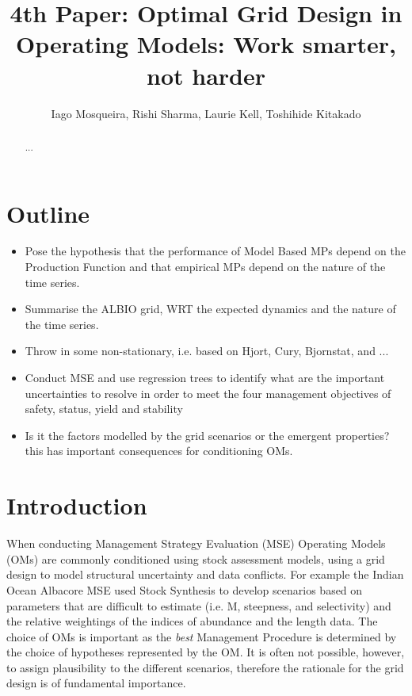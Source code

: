 \documentclass[a4paper]{article}
\title{4th Paper: Optimal Grid Design in Operating Models: Work smarter, not harder}
\author{Iago Mosqueira, Rishi Sharma, Laurie Kell, Toshihide  Kitakado}
\begin{document}
\maketitle

\begin{abstract}

... 

\end{abstract}

\section*{Outline}

\begin{itemize}
\item Pose the hypothesis that the performance of Model Based MPs depend on the Production Function and that empirical MPs depend on the nature of the time series.
\item Summarise the ALBIO grid, WRT the expected dynamics and the nature of the time series.
\item Throw in some non-stationary, i.e. based on Hjort, Cury, Bjornstat, and ...
\item Conduct MSE and use regression trees to identify what are the important uncertainties to resolve in order to meet the four management objectives of safety, status, yield and stability
\item Is it the factors modelled by the grid scenarios or the emergent properties? this has important consequences for conditioning OMs. 
\end{itemize}

\section{Introduction}

When conducting Management Strategy Evaluation (MSE) Operating Models (OMs) are commonly \citep[][]{} conditioned using stock assessment models, using a grid design to model structural uncertainty and data conflicts. For example the Indian Ocean Albacore MSE used Stock Synthesis to develop scenarios based on parameters that are difficult to estimate (i.e. M, steepness, and selectivity) and the relative weightings of the indices of abundance and the length data. The choice of OMs is important as the \textit{best} Management Procedure is determined by the choice of hypotheses represented by the OM.
It is often not possible, however, to assign plausibility to the different scenarios, therefore the rationale for the grid design is of fundamental importance.
\end{document}
